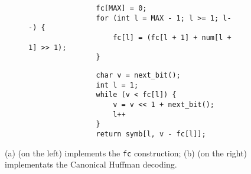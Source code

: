 \documentclass{subfiles}
\begin{document}
    \begin{figure}[!ht]
        \centering
        \begin{subfigure}{0.35\textwidth}
            \centering
            \begin{lstlisting}
                fc[MAX] = 0;
                for (int l = MAX - 1; l >= 1; l--) {
                    fc[l] = (fc[l + 1] + num[l + 1] >> 1);
                }
            \end{lstlisting}
            \label{Fig:2.a}
        \end{subfigure}
        \textwidth
        \begin{subfigure}{0.35\textwidth}
            \centering
            \begin{lstlisting}
                char v = next_bit();
                int l = 1;
                while (v < fc[l]) {
                    v = v << 1 + next_bit();
                    l++
                }
                return symb[l, v - fc[l]];
            \end{lstlisting}
            \label{Fig:2.b}
        \end{subfigure}
        \caption{(a) (on the left) implements the \lstinline{fc} construction;
        (b) (on the right) implementats the Canonical Huffman decoding.}
        \label{Fig:2}
    \end{figure}
\end{document}

